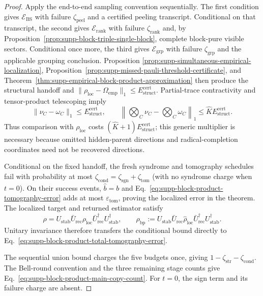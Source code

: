 \documentclass[
  aps,
  prx,
  reprint,
  superscriptaddress,
  amsmath,
  amssymb,
  nofootinbib,
  longbibliography
]{revtex4-2}
\begin{document}
\begin{proof}
Apply the end-to-end sampling convention sequentially.  The first condition
gives $\mathcal E_{\mathrm{BS}}$ with failure
$\zeta_{\mathrm{peel}}$ and a certified peeling transcript.  Conditional on
that transcript, the second gives $\mathcal E_{\mathrm{rank}}$ with failure
$\zeta_{\mathrm{rank}}$ and, by
Proposition~\ref{prop:supp-block-triple-single-block}, complete block-pure
visible sectors.  Conditional once more, the third gives
$\mathcal E_{\mathrm{grp}}$ with failure $\zeta_{\mathrm{grp}}$ and the
applicable grouping conclusion.  Proposition
\ref{prop:supp-simultaneous-empirical-localization},
Proposition~\ref{prop:supp-missed-pauli-threshold-certificate}, and
Theorem~\ref{thm:supp-empirical-block-product-approximation} then produce
the structural handoff and
$\|\rho_{\mathrm{loc}}-\Omega_{\mathrm{emp}}\|_1
\le E_{\mathrm{struct}}^{\mathrm{cert}}$.
Partial-trace contractivity and tensor-product telescoping imply
\begin{equation}
\|\nu_C-\omega_C\|_1\le E_{\mathrm{struct}}^{\mathrm{cert}},
\qquad
\left\|\bigotimes_C\nu_C-\bigotimes_C\omega_C\right\|_1
\le\widehat K E_{\mathrm{struct}}^{\mathrm{cert}}.
\end{equation}
Thus comparison with $\rho_{\mathrm{loc}}$ costs
$(\widehat K+1)E_{\mathrm{struct}}^{\mathrm{cert}}$; this generic
multiplier is necessary because omitted hidden-parent directions and
radical-completion coordinates need not be recovered directions.

Conditional on the fixed handoff, the fresh syndrome and tomography
schedules fail with probability at most
$\zeta_{\mathrm{cond}}=\zeta_{\mathrm{sgn}}+\zeta_{\mathrm{tom}}$
(with no syndrome charge when $t=0$).  On their success events,
$\widehat b=b$ and
Eq.~\eqref{eq:supp-block-product-tomography-error} adds at most
$\varepsilon_{\mathrm{tom}}$, proving the localized error in the theorem.
The localized target and returned estimator satisfy
\begin{equation}
\rho
=
U_{\mathrm{stab}}\bar U_{\mathrm{rec}}
\rho_{\mathrm{loc}}
\bar U_{\mathrm{rec}}^\dagger U_{\mathrm{stab}}^\dagger,
\qquad
\widehat\rho_{\mathrm{bp}}
:=
U_{\mathrm{stab}}\bar U_{\mathrm{rec}}
\widehat\rho_{\mathrm{loc}}
\bar U_{\mathrm{rec}}^\dagger U_{\mathrm{stab}}^\dagger.
\end{equation}
Unitary invariance therefore transfers the conditional bound directly to
Eq.~\eqref{eq:supp-block-product-total-tomography-error}.

The sequential union bound charges the five budgets once, giving
$1-\zeta_{\mathrm{str}}-\zeta_{\mathrm{cond}}$.  The Bell-round convention
and the three remaining stage counts give
Eq.~\eqref{eq:supp-block-product-main-copy-count}.  For $t=0$, the sign term
and its failure charge are absent.
\end{proof}
\end{document}

